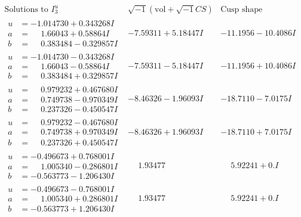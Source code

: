 \documentclass[1p]{elsarticle_modified}
\theoremstyle{definition}
\newcommand{\I}{\sqrt{-1}}
\begin{document}
$$\begin{array}{c|c|c}  
\text{Solutions to }I^u_{3}& \I (\text{vol} + \sqrt{-1}CS) & \text{Cusp shape}\\
 \hline 
\begin{aligned}
u &= -1.014730 + 0.343268 I \\
a &= \phantom{-}1.66043 + 0.58864 I \\
b &= \phantom{-}0.383484 - 0.329857 I\end{aligned}
 & -7.59311 + 5.18447 I & -11.1956 - 10.4086 I \\ \hline\begin{aligned}
u &= -1.014730 - 0.343268 I \\
a &= \phantom{-}1.66043 - 0.58864 I \\
b &= \phantom{-}0.383484 + 0.329857 I\end{aligned}
 & -7.59311 - 5.18447 I & -11.1956 + 10.4086 I \\ \hline\begin{aligned}
u &= \phantom{-}0.979232 + 0.467680 I \\
a &= \phantom{-}0.749738 - 0.970349 I \\
b &= \phantom{-}0.237326 - 0.450547 I\end{aligned}
 & -8.46326 - 1.96093 I & -18.7110 - 7.0175 I \\ \hline\begin{aligned}
u &= \phantom{-}0.979232 - 0.467680 I \\
a &= \phantom{-}0.749738 + 0.970349 I \\
b &= \phantom{-}0.237326 + 0.450547 I\end{aligned}
 & -8.46326 + 1.96093 I & -18.7110 + 7.0175 I \\ \hline\begin{aligned}
u &= -0.496673 + 0.768001 I \\
a &= \phantom{-}1.005340 - 0.286801 I \\
b &= -0.563773 - 1.206430 I\end{aligned}
 & \phantom{-}1.93477\phantom{ +0.000000I} & \phantom{-}5.92241 + 0. I\phantom{ +0.000000I} \\ \hline\begin{aligned}
u &= -0.496673 - 0.768001 I \\
a &= \phantom{-}1.005340 + 0.286801 I \\
b &= -0.563773 + 1.206430 I\end{aligned}
 & \phantom{-}1.93477\phantom{ +0.000000I} & \phantom{-}5.92241 + 0. I\phantom{ +0.000000I} \\ \hline\begin{aligned}

\end{aligned}
\end{array}$$
\end{document}
